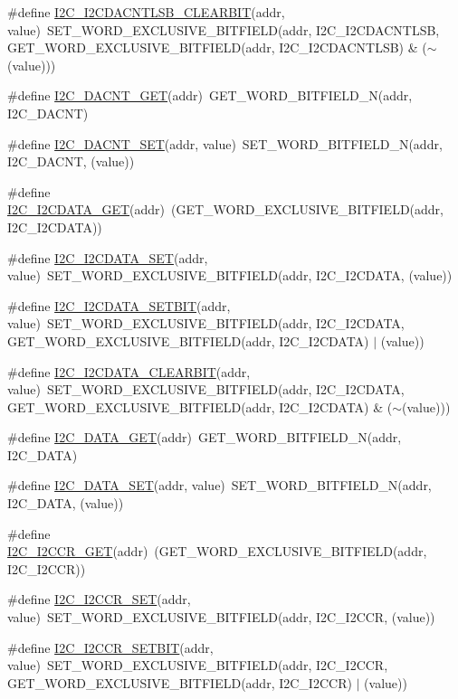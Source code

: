 \begin{DoxyCompactItemize}
\item 
\#define \hyperlink{a00557_a1fb006220cf2477abc844382ae68acbb}{I2C\_\-I2CDACNTLSB\_\-CLEARBIT}(addr, value)~SET\_\-WORD\_\-EXCLUSIVE\_\-BITFIELD(addr, I2C\_\-I2CDACNTLSB, GET\_\-WORD\_\-EXCLUSIVE\_\-BITFIELD(addr, I2C\_\-I2CDACNTLSB) \& ($\sim$(value)))
\item 
\#define \hyperlink{a00557_a1e98d9878c4ccb026322d2dae0d4af3d}{I2C\_\-DACNT\_\-GET}(addr)~GET\_\-WORD\_\-BITFIELD\_\-N(addr, I2C\_\-DACNT)
\item 
\#define \hyperlink{a00557_a0461b9da89519b85968824aac8731aa0}{I2C\_\-DACNT\_\-SET}(addr, value)~SET\_\-WORD\_\-BITFIELD\_\-N(addr, I2C\_\-DACNT, (value))
\item 
\#define \hyperlink{a00557_a0b2ee8e4e39acec922378091e0df1d84}{I2C\_\-I2CDATA\_\-GET}(addr)~(GET\_\-WORD\_\-EXCLUSIVE\_\-BITFIELD(addr, I2C\_\-I2CDATA))
\item 
\#define \hyperlink{a00557_aa043aead41630635b1bbdc6bcb3fb2ce}{I2C\_\-I2CDATA\_\-SET}(addr, value)~SET\_\-WORD\_\-EXCLUSIVE\_\-BITFIELD(addr, I2C\_\-I2CDATA, (value))
\item 
\#define \hyperlink{a00557_af9ad9a745b59992004def998623cf88a}{I2C\_\-I2CDATA\_\-SETBIT}(addr, value)~SET\_\-WORD\_\-EXCLUSIVE\_\-BITFIELD(addr, I2C\_\-I2CDATA, GET\_\-WORD\_\-EXCLUSIVE\_\-BITFIELD(addr, I2C\_\-I2CDATA) $|$ (value))
\item 
\#define \hyperlink{a00557_aa02ac2b185cda7638ab5af269bf2886b}{I2C\_\-I2CDATA\_\-CLEARBIT}(addr, value)~SET\_\-WORD\_\-EXCLUSIVE\_\-BITFIELD(addr, I2C\_\-I2CDATA, GET\_\-WORD\_\-EXCLUSIVE\_\-BITFIELD(addr, I2C\_\-I2CDATA) \& ($\sim$(value)))
\item 
\#define \hyperlink{a00557_aa3015dbe0e0d6531e0ac9be9a5c6d770}{I2C\_\-DATA\_\-GET}(addr)~GET\_\-WORD\_\-BITFIELD\_\-N(addr, I2C\_\-DATA)
\item 
\#define \hyperlink{a00557_aee6980b8d1c1920064a393a49cd10c85}{I2C\_\-DATA\_\-SET}(addr, value)~SET\_\-WORD\_\-BITFIELD\_\-N(addr, I2C\_\-DATA, (value))
\item 
\#define \hyperlink{a00557_a7a8c59cc409e719ac210133eb6e8e9d2}{I2C\_\-I2CCR\_\-GET}(addr)~(GET\_\-WORD\_\-EXCLUSIVE\_\-BITFIELD(addr, I2C\_\-I2CCR))
\item 
\#define \hyperlink{a00557_a2a2d7c99edc72acb5c73072afd705f82}{I2C\_\-I2CCR\_\-SET}(addr, value)~SET\_\-WORD\_\-EXCLUSIVE\_\-BITFIELD(addr, I2C\_\-I2CCR, (value))
\item 
\#define \hyperlink{a00557_ad6ed3bb6eef103433e586a787690523a}{I2C\_\-I2CCR\_\-SETBIT}(addr, value)~SET\_\-WORD\_\-EXCLUSIVE\_\-BITFIELD(addr, I2C\_\-I2CCR, GET\_\-WORD\_\-EXCLUSIVE\_\-BITFIELD(addr, I2C\_\-I2CCR) $|$ (value))

\end{DoxyCompactItemize}
